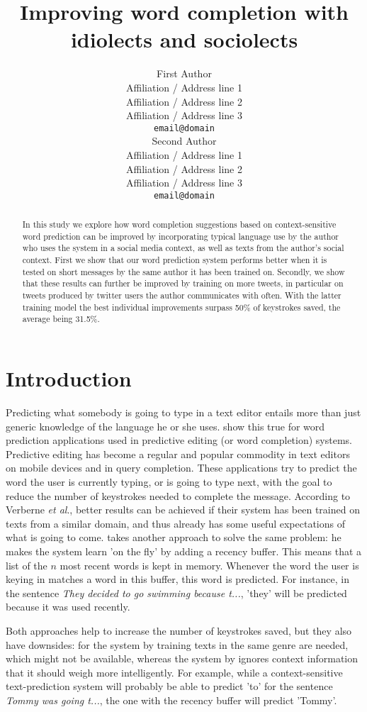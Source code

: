 \documentclass[11pt]{article}
\title{Improving word completion with idiolects and sociolects}
\author{First Author \\
  Affiliation / Address line 1 \\
  Affiliation / Address line 2 \\
  Affiliation / Address line 3 \\
  {\tt email@domain} \\\And
  Second Author \\
  Affiliation / Address line 1 \\
  Affiliation / Address line 2 \\
  Affiliation / Address line 3 \\
  {\tt email@domain} \\}
\date{}
\begin{document}
\maketitle

\begin{abstract} 
In this study we explore how word completion suggestions based on context-sensitive word prediction can be improved by incorporating typical language use by the author who uses the system in a social media context, as well as texts from the author's social context. First we show that our word prediction system performs better when it is tested on short messages by the same author it has been trained on. Secondly, we show that these results can further be improved by training on more tweets, in particular on tweets produced by twitter users the author communicates with often. With the latter training model the best individual improvements surpass 50\% of keystrokes saved, the average being 31.5\%.


\end{abstract}

\section{Introduction}
Predicting what somebody is going to type in a text editor entails more than just generic knowledge of the language he or she uses.  show this true for word prediction applications used in predictive editing (or word completion) systems. Predictive editing has become a regular and popular commodity in text editors on mobile devices and in query completion. These applications try to predict the word the user is currently typing, or is going to type next, with the goal to reduce the number of keystrokes needed to complete the message. According to Verberne {\it et al}., better results can be achieved if their system has been trained on texts from a similar domain, and thus already has some useful expectations of what is going to come.  takes another approach to solve the same problem: he makes the system learn 'on the fly' by adding a recency buffer. This means that a list of the $n$ most recent words is kept in memory. Whenever the word the user is keying in matches a word in this buffer, this word is predicted. For instance, in the sentence \emph{They decided to go swimming because t...}, 'they' will be predicted because it was used recently.

Both approaches help to increase the number of keystrokes saved, but they also have downsides: for the system by  training texts in the same genre are needed, which might not be available, whereas the system by  ignores context information that it should weigh more intelligently. For example, while a context-sensitive text-prediction system will probably be able to predict 'to' for the sentence \emph{Tommy was going t...}, the one with the recency buffer will predict 'Tommy'.
\end{document}

